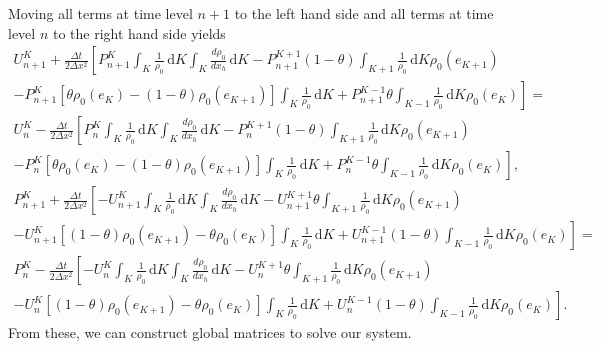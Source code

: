 \documentclass{article}
\begin{document}
Moving all terms at time level $n+1$ to the left hand side and all terms at time level $n$ to the right hand side yields
\begin{equation}
	\begin{aligned}
		U^K_{n+1} + \frac{\Delta t}{2 \Delta x^2} \left[ P^K_{n+1} \int_K \! \frac{1}{\rho_0} \, \mathrm{d}K \int_K \! \frac{d \rho_0}{d x_h} \, \mathrm{d}K - P^{K+1}_{n+1} (1-\theta) \int_{K+1} \! \frac{1}{\rho_0} \, \mathrm{d}K \rho_0(e_{K+1}) \right. \\
		\left. - P^K_{n+1} [\theta \rho_0(e_K) - (1-\theta) \rho_0(e_{K+1})] \int_K \! \frac{1}{\rho_0} \, \mathrm{d}K + P^{K-1}_{n+1} \theta \int_{K-1} \! \frac{1}{\rho_0} \, \mathrm{d}K \rho_0(e_K)\right] = \\
	U^K_{n} - \frac{\Delta t}{2 \Delta x^2} \left[ P^K_{n} \int_K \! \frac{1}{\rho_0} \, \mathrm{d}K \int_K \! \frac{d \rho_0}{d x_h} \, \mathrm{d}K - P^{K+1}_{n} (1-\theta) \int_{K+1} \! \frac{1}{\rho_0} \, \mathrm{d}K \rho_0(e_{K+1}) \right. \\
		\left. - P^K_{n} [\theta \rho_0(e_K) - (1-\theta) \rho_0(e_{K+1})] \int_K \! \frac{1}{\rho_0} \, \mathrm{d}K + P^{K-1}_{n} \theta \int_{K-1} \! \frac{1}{\rho_0} \, \mathrm{d}K \rho_0(e_K)\right], \\
	P^K_{n+1} + \frac{\Delta t}{2 \Delta x^2} \left[- U^K_{n+1} \int_K \! \frac{1}{\rho_0} \, \mathrm{d}K   \int_K \! \frac{d \rho_0}{d x_h} \, \mathrm{d}K		 - U^{K+1}_{n+1} \theta \int_{K+1} \! \frac{1}{\rho_0} \, \mathrm{d}K \rho_0(e_{K+1}) \right. \\
	\left. - U^K_{n+1} [(1-\theta) \rho_0(e_{K+1}) - \theta \rho_0(e_K)] \int_K \! \frac{1}{\rho_0} \, \mathrm{d}K + U^{K-1}_{n+1}  (1-\theta) \int_{K-1} \! \frac{1}{\rho_0} \, \mathrm{d}K \rho_0(e_K) \right] = \\
	P^K_{n} - \frac{\Delta t}{2 \Delta x^2} \left[- U^K_{n} \int_K \! \frac{1}{\rho_0} \, \mathrm{d}K   \int_K \! \frac{d \rho_0}{d x_h} \, \mathrm{d}K		 - U^{K+1}_{n} \theta \int_{K+1} \! \frac{1}{\rho_0} \, \mathrm{d}K \rho_0(e_{K+1}) \right. \\
	\left. - U^K_{n} [(1-\theta) \rho_0(e_{K+1}) - \theta \rho_0(e_K)] \int_K \! \frac{1}{\rho_0} \, \mathrm{d}K + U^{K-1}_{n}  (1-\theta) \int_{K-1} \! \frac{1}{\rho_0} \, \mathrm{d}K \rho_0(e_K) \right].
	\end{aligned}
\end{equation}
From these, we can construct global matrices to solve our system.
\end{document}
